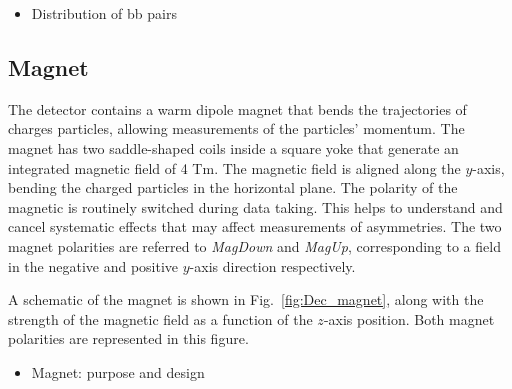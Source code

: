 {\color{Green}
\begin{itemize}
\item Distribution of bb pairs
\end{itemize}
}

\subsection{Magnet}

The \lhcb detector contains a warm dipole magnet that bends the trajectories of charges particles, allowing measurements of the particles' momentum. The magnet has two saddle-shaped coils inside a square yoke that generate an integrated magnetic field of 4 Tm.  
The magnetic field is aligned along the $y$-axis, bending the charged particles in the horizontal plane. The polarity of the magnetic is routinely switched during data taking. This helps to understand and cancel systematic effects that may affect measurements of \CP asymmetries. The two magnet polarities are referred to \emph{MagDown} and \emph{MagUp}, corresponding to a field in the negative and positive $y$-axis direction respectively.   

A schematic of the magnet is shown in Fig.~\ref{fig:Dec_magnet}, along with the strength of the magnetic field as a function of the $z$-axis position. Both magnet polarities are represented in this figure. 

{\color{Red}
\begin{itemize}
\item Magnet: purpose and design 
\end{itemize}
}


